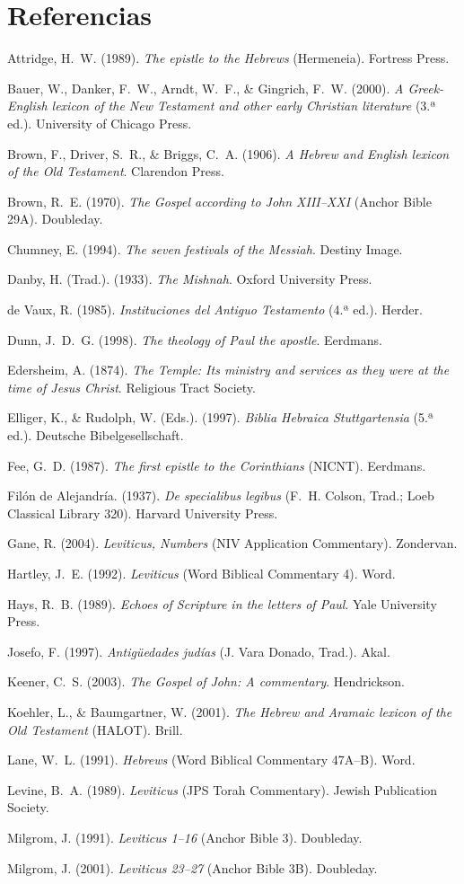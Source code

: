 \documentclass[11pt,letterpaper]{article}
\newcommand{\refapa}[1]{\par{\RaggedRight\hangindent=1.27cm\hangafter=1\noindent #1\par}\vspace{4pt}}
\begin{document}
\section*{Referencias}
\small
\refapa{Attridge, H.~W. (1989). \emph{The epistle to the Hebrews} (Hermeneia). Fortress Press.}
\refapa{Bauer, W., Danker, F.~W., Arndt, W.~F., \& Gingrich, F.~W. (2000). \emph{A Greek-English lexicon of the New Testament and other early Christian literature} (3.ª ed.). University of Chicago Press.}
\refapa{Brown, F., Driver, S.~R., \& Briggs, C.~A. (1906). \emph{A Hebrew and English lexicon of the Old Testament}. Clarendon Press.}
\refapa{Brown, R.~E. (1970). \emph{The Gospel according to John XIII--XXI} (Anchor Bible 29A). Doubleday.}
\refapa{Chumney, E. (1994). \emph{The seven festivals of the Messiah}. Destiny Image.}
\refapa{Danby, H. (Trad.). (1933). \emph{The Mishnah}. Oxford University Press.}
\refapa{de Vaux, R. (1985). \emph{Instituciones del Antiguo Testamento} (4.ª ed.). Herder.}
\refapa{Dunn, J.~D.~G. (1998). \emph{The theology of Paul the apostle}. Eerdmans.}
\refapa{Edersheim, A. (1874). \emph{The Temple: Its ministry and services as they were at the time of Jesus Christ}. Religious Tract Society.}
\refapa{Elliger, K., \& Rudolph, W. (Eds.). (1997). \emph{Biblia Hebraica Stuttgartensia} (5.ª ed.). Deutsche Bibelgesellschaft.}
\refapa{Fee, G.~D. (1987). \emph{The first epistle to the Corinthians} (NICNT). Eerdmans.}
\refapa{Filón de Alejandría. (1937). \emph{De specialibus legibus} (F.~H. Colson, Trad.; Loeb Classical Library 320). Harvard University Press.}
\refapa{Gane, R. (2004). \emph{Leviticus, Numbers} (NIV Application Commentary). Zondervan.}
\refapa{Hartley, J.~E. (1992). \emph{Leviticus} (Word Biblical Commentary 4). Word.}
\refapa{Hays, R.~B. (1989). \emph{Echoes of Scripture in the letters of Paul}. Yale University Press.}
\refapa{Josefo, F. (1997). \emph{Antigüedades judías} (J. Vara Donado, Trad.). Akal.}
\refapa{Keener, C.~S. (2003). \emph{The Gospel of John: A commentary}. Hendrickson.}
\refapa{Koehler, L., \& Baumgartner, W. (2001). \emph{The Hebrew and Aramaic lexicon of the Old Testament} (HALOT). Brill.}
\refapa{Lane, W.~L. (1991). \emph{Hebrews} (Word Biblical Commentary 47A--B). Word.}
\refapa{Levine, B.~A. (1989). \emph{Leviticus} (JPS Torah Commentary). Jewish Publication Society.}
\refapa{Milgrom, J. (1991). \emph{Leviticus 1--16} (Anchor Bible 3). Doubleday.}
\refapa{Milgrom, J. (2001). \emph{Leviticus 23--27} (Anchor Bible 3B). Doubleday.}
\end{document}
